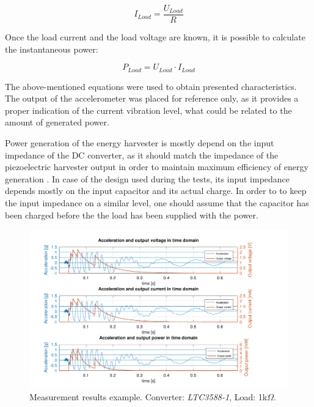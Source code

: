 \documentclass[12pt,a4paper]{article}
\begin{document}
\begin{equation}
	I_{Load} = \frac{U_{Load}}{R}
	\label{eqn:current}
\end{equation}

Once the load current and the load voltage are known, it is possible to calculate the instantaneous power:

\begin{equation}
	P_{Load} = U_{Load} \cdot I_{Load}
	\label{eqn:power}
\end{equation}

The above-mentioned equations were used to obtain presented characteristics. The output of the accelerometer was placed for reference only, as it provides a proper indication of the current vibration level, what could be related to the amount of generated power.

\par
Power generation of the energy harvester is mostly depend on the input impedance of the DC converter, as it should match the impedance of the piezoelectric harvester output in order to maintain maximum efficiency of energy generation \cite{EnHv2}. In case of the design used during the tests, its input impedance depends mostly on the input capacitor and its actual charge. In order to to keep the input impedance on a similar level, one should assume that the capacitor has been charged before the the load has been supplied with the power.


\begin{landscape} 
\begin{figure}[ht!]
\includegraphics[scale=1.05]{timedomainltc35881k.pdf}
\caption{Measurement results example. Converter: \textit{LTC3588-1}, Load: 1k$\Omega$.}
\label{fig:timedomainltc35881k}
\end{figure}
\end{landscape}
\end{document}
